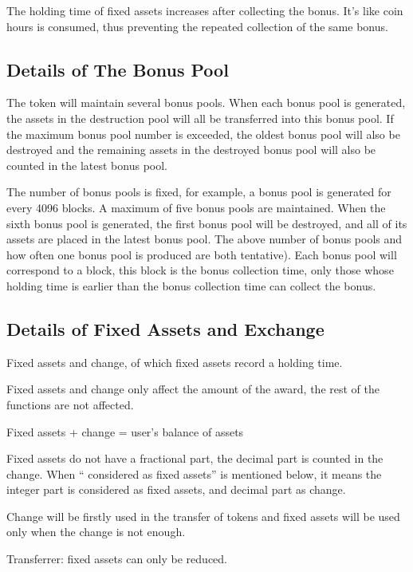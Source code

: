 \documentclass[letterpaper,10pt,english]{sphinxmanual}
\begin{document}
The holding time of fixed assets increases after collecting the bonus. It’s like coin hours is consumed, thus preventing the repeated collection of the same bonus.


\subsection{Details of The Bonus Pool}
\label{\detokenize{nns_protocol:details-of-the-bonus-pool}}
The token will maintain several bonus pools. When each bonus pool is generated, the assets in the destruction pool will all be transferred into this bonus pool.
If the maximum bonus pool number is exceeded, the oldest bonus pool will also be destroyed and the remaining assets in the destroyed bonus pool will also be counted in the latest bonus pool.

The number of bonus pools is fixed, for example, a bonus pool is generated for every 4096 blocks.
A maximum of five bonus pools are maintained. When the sixth bonus pool is generated, the first bonus pool will be destroyed,
and all of its assets are placed in the latest bonus pool. The above number of bonus pools and how often one bonus pool is produced are both tentative).
Each bonus pool will correspond to a block, this block is the bonus collection time, only those whose holding time is earlier than
the bonus collection time can collect the bonus.


\subsection{Details of Fixed Assets and Exchange}
\label{\detokenize{nns_protocol:details-of-fixed-assets-and-exchange}}
Fixed assets and change, of which fixed assets record a holding time.

Fixed assets and change only affect the amount of the award, the rest of the functions are not affected.

Fixed assets + change = user’s balance of assets

Fixed assets do not have a fractional part, the decimal part is counted in the change. When “ considered as fixed assets” is mentioned below, it means the integer part is considered as fixed assets, and decimal part as change.

Change will be firstly used in the transfer of tokens and fixed assets will be used only when the change is not enough.

Transferrer: fixed assets can only be reduced.
\end{document}
